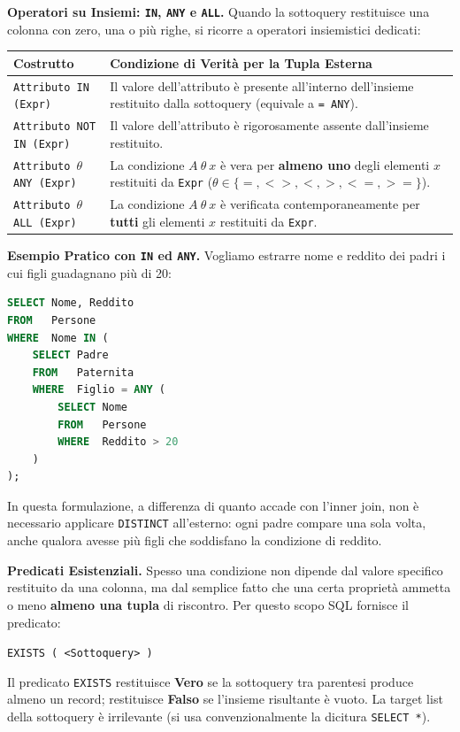 \documentclass[12pt]{extarticle}
\begin{document}
\medskip
\noindent \textbf{Operatori su Insiemi: \texttt{IN}, \texttt{ANY} e \texttt{ALL}.} Quando la sottoquery restituisce una colonna con zero, una o più righe, si ricorre a operatori insiemistici dedicati:

\begin{center}
\small
\begin{tabular}{lp{10cm}}
    \toprule
    \textbf{Costrutto} & \textbf{Condizione di Verità per la Tupla Esterna} \\
    \midrule
    \texttt{Attributo IN (Expr)} & Il valore dell'attributo è presente all'interno dell'insieme restituito dalla sottoquery (equivale a \texttt{= ANY}). \\
    \addlinespace
    \texttt{Attributo NOT IN (Expr)} & Il valore dell'attributo è rigorosamente assente dall'insieme restituito. \\
    \addlinespace
    \texttt{Attributo $\theta$ ANY (Expr)} & La condizione $A \ \theta \ x$ è vera per \textbf{almeno uno} degli elementi $x$ restituiti da \texttt{Expr} ($\theta \in \{=, <>, <, >, <=, >=\}$). \\
    \addlinespace
    \texttt{Attributo $\theta$ ALL (Expr)} & La condizione $A \ \theta \ x$ è verificata contemporaneamente per \textbf{tutti} gli elementi $x$ restituiti da \texttt{Expr}. \\
    \bottomrule
\end{tabular}
\end{center}

\medskip
\noindent \textbf{Esempio Pratico con \texttt{IN} ed \texttt{ANY}.} Vogliamo estrarre nome e reddito dei padri i cui figli guadagnano più di 20:
\begin{lstlisting}[language=SQL]
SELECT Nome, Reddito
FROM   Persone
WHERE  Nome IN (
    SELECT Padre
    FROM   Paternita
    WHERE  Figlio = ANY (
        SELECT Nome
        FROM   Persone
        WHERE  Reddito > 20
    )
);
\end{lstlisting}
In questa formulazione, a differenza di quanto accade con l'inner join, non è necessario applicare \texttt{DISTINCT} all'esterno: ogni padre compare una sola volta, anche qualora avesse più figli che soddisfano la condizione di reddito.

\noindent \textbf{Predicati Esistenziali.} Spesso una condizione non dipende dal valore specifico restituito da una colonna, ma dal semplice fatto che una certa proprietà ammetta o meno \textbf{almeno una tupla} di riscontro. Per questo scopo SQL fornisce il predicato:
\begin{center}
\texttt{EXISTS ( <Sottoquery> )}
\end{center}
Il predicato \texttt{EXISTS} restituisce \textbf{Vero} se la sottoquery tra parentesi produce almeno un record; restituisce \textbf{Falso} se l'insieme risultante è vuoto. La target list della sottoquery è irrilevante (si usa convenzionalmente la dicitura \texttt{SELECT *}).
\end{document}
